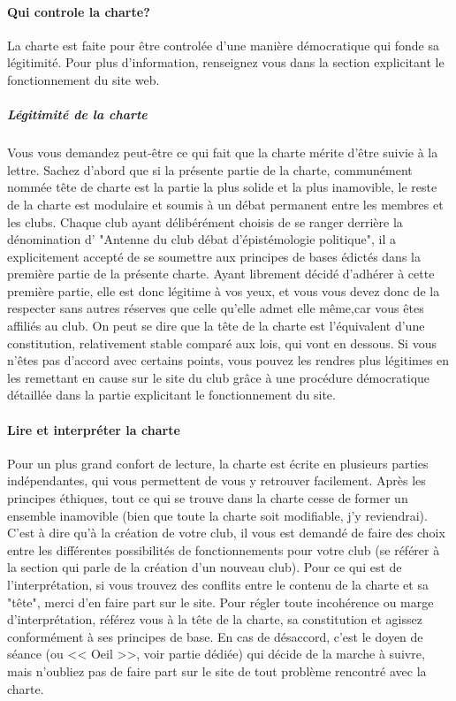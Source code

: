 \documentclass[a4paper,12pt]{article}
\begin{document}
\paragraph{Qui controle la charte?}
La charte est faite pour être controlée d'une manière démocratique qui fonde sa légitimité. Pour plus d'information, renseignez vous dans la section explicitant le fonctionnement du site web.
\subparagraph{Légitimité de la charte}
Vous vous demandez peut-être ce qui fait que la charte mérite d'être suivie à la lettre. Sachez d'abord que si la présente partie de la charte, communément nommée tête de charte est la partie la plus solide et la plus inamovible, le reste de la charte est modulaire et soumis à un débat permanent entre les membres et les clubs. Chaque club ayant délibérément choisis de se ranger derrière la dénomination d' "Antenne du club débat d'épistémologie politique", il a explicitement accepté de se soumettre aux principes de bases édictés dans la première partie de la présente charte. Ayant librement décidé d'adhérer à cette première partie, elle est donc légitime à vos yeux, et vous vous devez donc de la respecter sans autres réserves que celle qu'elle admet elle même,car vous êtes affiliés au club. On peut se dire que la tête de la charte est l'équivalent d'une constitution, relativement stable comparé aux lois, qui vont en dessous. Si vous n'êtes pas d'accord avec certains points, vous pouvez les rendres plus légitimes en les remettant en cause sur le site du club grâce à une procédure démocratique détaillée dans la partie explicitant le fonctionnement du site.

\paragraph{Lire et interpréter la charte}
Pour un plus grand confort de lecture, la charte est écrite en plusieurs parties indépendantes, qui vous permettent de vous y retrouver facilement. Après les principes éthiques, tout ce qui se trouve dans la charte cesse de former un ensemble inamovible (bien que toute la charte soit modifiable, j'y reviendrai). C'est à dire qu'à la création de votre club, il vous est demandé de faire des choix entre les différentes possibilités de fonctionnements pour votre club (se référer à la section qui parle de la création d'un nouveau club). Pour ce qui est de l'interprétation, si vous trouvez des conflits entre le contenu de la charte et sa "tête", merci d'en faire part sur le site. Pour régler toute incohérence ou marge d'interprétation, référez vous à la tête de la charte, sa constitution et agissez conformément à ses principes de base. En cas de désaccord, c'est le doyen de séance (ou << Oeil >>, voir partie dédiée) qui décide de la marche à suivre, mais n'oubliez pas de faire part sur le site de tout problème rencontré avec la charte.
\end{document}
